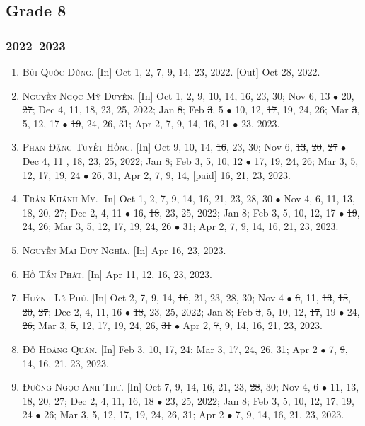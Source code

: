\documentclass{article}
\begin{document}
\subsection{Grade 8}

\subsubsection{2022--2023}

\begin{enumerate}
	\item \textsc{Bùi Quốc Dũng.} \textsf{[In]} Oct 1, 2, 7, 9, 14, 23, 2022. \textsf{[Out]} Oct 28, 2022.
	\item \textsc{Nguyễn Ngọc Mỹ Duyên.} \textsf{[In]} Oct \st{1}, 2, 9, 10, 14, \st{16}, \st{23}, 30; Nov \st{6}, 13 $\bullet$ 20, \st{27}; Dec 4, 11, 18, 23, 25, 2022; Jan \st{8}; Feb \st{3}, 5 $\bullet$ 10, 12, \st{17}, 19, 24, 26; Mar \st{3}, 5, 12, 17 $\bullet$ \st{19}, 24, 26, 31; Apr 2, 7, 9, 14, 16, 21 $\bullet$ 23, 2023.
	\item \textsc{Phan Đặng Tuyết Hồng.} \textsf{[In]} Oct 9, 10, 14, \st{16}, 23, 30; Nov 6, \st{13}, \st{20}, \st{27} $\bullet$ Dec 4, 11 , 18, 23, 25, 2022; Jan 8; Feb \st{3}, 5, 10, 12 $\bullet$ \st{17}, 19, 24, 26; Mar 3, \st{5}, \st{12}, 17, 19, 24 $\bullet$ 26, 31, Apr 2, 7, 9, 14, [paid] 16, 21, 23, 2023.
	\item \textsc{Trần Khánh My.} \textsf{[In]} Oct 1, 2, 7, 9, 14, 16, 21, 23, 28, 30 $\bullet$ Nov 4, 6, 11, 13, 18, 20, 27; Dec 2, 4, 11 $\bullet$ 16, \st{18}, 23, 25, 2022; Jan 8; Feb 3, 5, 10, 12, 17 $\bullet$ \st{19}, 24, 26; Mar 3, 5, 12, 17, 19, 24, 26 $\bullet$ 31; Apr 2, 7, 9, 14, 16, 21, 23, 2023.
	\item \textsc{Nguyễn Mai Duy Nghĩa.} \textsf{[In]} Apr 16, 23, 2023.
	\item \textsc{Hồ Tấn Phát.} \textsf{[In]} Apr 11, 12, 16, 23, 2023.
	\item \textsc{Huỳnh Lê Phú.} \textsf{[In]} Oct 2, 7, 9, 14, \st{16}, 21, 23, 28, 30; Nov 4 $\bullet$ \st{6}, 11, \st{13}, \st{18}, \st{20}, \st{27}; Dec 2, 4, 11, 16 $\bullet$ \st{18}, 23, 25, 2022; Jan 8; Feb \st{3}, 5, 10, 12, \st{17}, 19 $\bullet$ 24, \st{26}; Mar 3, \st{5}, 12, 17, 19, 24, 26, \st{31} $\bullet$ Apr 2, \st{7}, 9, 14, 16, 21, 23, 2023.
	\item \textsc{Đỗ Hoàng Quân.} \textsf{[In]} Feb 3, 10, 17, 24; Mar 3, 17, 24, 26, 31; Apr 2 $\bullet$ 7, \st{9}, 14, 16, 21, 23, 2023.
	\item \textsc{Đường Ngọc Anh Thư.} \textsf{[In]} Oct 7, 9, 14, 16, 21, 23, \st{28}, 30; Nov 4, 6 $\bullet$ 11, 13, 18, 20, 27; Dec 2, 4, 11, 16, 18 $\bullet$ 23, 25, 2022; Jan 8; Feb 3, 5, 10, 12, 17, 19, 24 $\bullet$ 26; Mar 3, 5, 12, 17, 19, 24, 26, 31; Apr 2 $\bullet$ 7, 9, 14, 16, 21, 23, 2023.
\end{enumerate}
\end{document}
